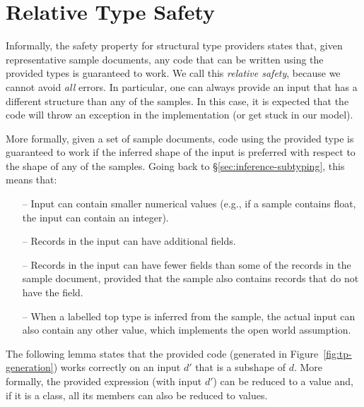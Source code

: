 \documentclass[pldi-cameraready]{sigplanconf-pldi16}
\begin{document}

%
%

\section{Relative Type Safety}
\label{sec:safety}

Informally, the safety property for structural type providers states that, given representative sample
documents, any code that can be written using the provided types is guaranteed to work. We call this
\emph{relative safety}, because we cannot avoid \emph{all} errors. In particular, one can always
provide an input that has a different structure than any of the samples. In this case, it is expected
that the code will throw an exception in the implementation (or get stuck in our model).

More formally, given a set of sample documents, code using the provided type is guaranteed to work if
the inferred shape of the input is preferred with respect to the shape of any of the samples. Going back to
\S\ref{sec:inference-subtyping}, this means that:
%
\begin{itemize}
\item[--] Input can contain smaller numerical values (e.g., if a sample contains float, the input can contain an integer).
\item[--] Records in the input can have additional fields.
\item[--] Records in the input can have fewer fields than some of the records in the sample
  document, provided that the sample also contains records that do not have the field.
\item[--] When a labelled top type is inferred from the sample, the actual input can also contain any other value,
  which implements the open world assumption.
\end{itemize}
%
The following lemma states that the provided code (generated in Figure~\ref{fig:tp-generation})
works correctly on an input $d'$ that is a subshape of $d$. More formally, the provided
expression (with input $d'$) can be reduced to a value and, if it is a class,
all its members can also be reduced to values.
\end{document}
